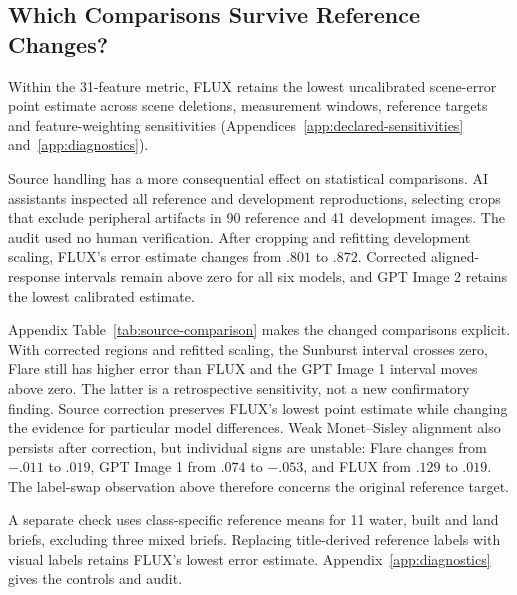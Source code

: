 \subsection{Which Comparisons Survive Reference Changes?}\label{sec:source-correction}
Within the 31-feature metric, FLUX retains the lowest uncalibrated scene-error point
estimate across scene deletions, measurement windows, reference targets and
feature-weighting sensitivities (Appendices~\ref{app:declared-sensitivities}
and~\ref{app:diagnostics}).

Source handling has a more consequential effect on statistical comparisons.
AI assistants inspected all reference and development reproductions, selecting
crops that exclude peripheral artifacts in 90 reference and 41 development images.
The audit used no human verification. After cropping and refitting development scaling,
FLUX's error estimate changes from $.801$ to $.872$. Corrected aligned-response
intervals remain above zero for all six models, and GPT Image 2 retains the lowest
calibrated estimate.

Appendix Table~\ref{tab:source-comparison} makes the changed comparisons explicit. With
corrected regions and refitted scaling, the Sunburst interval crosses zero,
Flare still has higher error than FLUX and the GPT Image 1 interval moves above zero. The latter
is a retrospective sensitivity, not a new confirmatory finding. Source correction
preserves FLUX's lowest point estimate while changing the evidence for particular
model differences.
Weak Monet--Sisley alignment also persists after correction, but individual
signs are unstable: Flare changes from $-.011$ to $.019$, GPT Image 1 from
$.074$ to $-.053$, and FLUX from $.129$ to $.019$. The label-swap observation
above therefore concerns the original reference target.






A separate check uses class-specific reference means for 11 water, built and
land briefs, excluding three mixed briefs. Replacing title-derived reference
labels with visual labels retains FLUX's lowest error estimate.
Appendix~\ref{app:diagnostics} gives the controls and audit.\par



